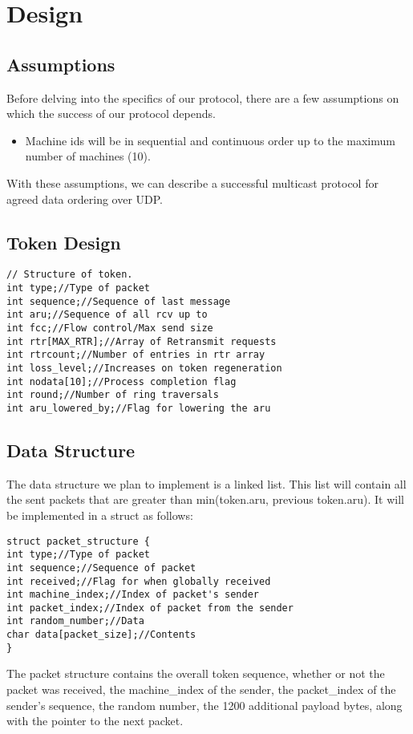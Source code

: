 \documentclass[12pt,journal,compsoc]{IEEEtran}
\begin{document}
\section{Design}
\subsection{Assumptions}
Before delving into the specifics of our protocol, there are a few assumptions on which the success of our protocol depends.
\begin{itemize}
\item Machine ids will be in sequential and continuous order up to the maximum number of machines (10).
\end{itemize}
With these assumptions, we can describe a successful multicast protocol for agreed data ordering over UDP.
\subsection{Token Design}
\begin{lstlisting}
// Structure of token.
int type;//Type of packet
int sequence;//Sequence of last message
int aru;//Sequence of all rcv up to
int fcc;//Flow control/Max send size
int rtr[MAX_RTR];//Array of Retransmit requests
int rtrcount;//Number of entries in rtr array
int loss_level;//Increases on token regeneration
int nodata[10];//Process completion flag
int round;//Number of ring traversals
int aru_lowered_by;//Flag for lowering the aru
\end{lstlisting}
\subsection{Data Structure}
The data structure we plan to implement is a linked list. This list will contain all the sent packets that are greater than min(token.aru, previous token.aru). It will be implemented in a struct as follows:
\begin{lstlisting}
struct packet_structure {
int type;//Type of packet
int sequence;//Sequence of packet
int received;//Flag for when globally received
int machine_index;//Index of packet's sender
int packet_index;//Index of packet from the sender
int random_number;//Data
char data[packet_size];//Contents
}
\end{lstlisting}
The packet structure contains the overall token sequence, whether or not the packet was received, the machine\_index of the sender, the packet\_index of the sender's sequence, the random number, the 1200 additional payload bytes, along with the pointer to the next packet.\\
\\
\end{document}

